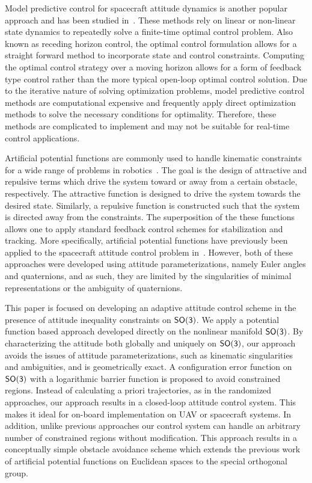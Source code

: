 \documentclass[fleqn]{IJCAS}  %
\begin{document}
\begin{multicols}{2}
Model predictive control for spacecraft attitude dynamics is another popular approach and has been studied in~\cite{guiggiani2014,kalabic2014,gupta2015}.
These methods rely on linear or non-linear state dynamics to repeatedly solve a finite-time optimal control problem.
Also known as receding horizon control, the optimal control formulation allows for a straight forward method to incorporate state and control constraints.
Computing the optimal control strategy over a moving horizon allows for a form of feedback type control rather than the more typical open-loop optimal control solution.
Due to the iterative nature of solving optimization problems, model predictive control methods are computational expensive and frequently apply direct optimization methods to solve the necessary conditions for optimality.
Therefore, these methods are complicated to implement and may not be suitable for real-time control applications.
  
Artificial potential functions are commonly used to handle kinematic constraints for a wide range of problems in robotics~\cite{rimon1992}.
The goal is the design of attractive and repulsive terms which drive the system toward or away from a certain obstacle, respectively.
The attractive function is designed to drive the system towards the desired state.
Similarly, a repulsive function is constructed such that the system is directed away from the constraints. 
The superposition of the these functions allows one to apply standard feedback control schemes for stabilization and tracking.
More specifically, artificial potential functions have previously been applied to the spacecraft attitude control problem in~\cite{lee2011b,mcinnes1994}.
However, both of these approaches were developed using attitude parameterizations, namely Euler angles and quaternions, and as such, they are limited by the singularities of minimal representations or the ambiguity of quaternions.

This paper is focused on developing an adaptive attitude control scheme in the presence of attitude inequality constraints on \(\mathsf{SO(3)}\).
We apply a potential function based approach developed directly on the nonlinear manifold \(\mathsf{SO(3)}\). 
By characterizing the attitude both globally and uniquely on \(\mathsf{SO(3)}\), our approach avoids the issues of attitude parameterizations, such as kinematic singularities and ambiguities, and is geometrically exact. 
A configuration error function on \(\mathsf{SO(3)}\) with a logarithmic barrier function is proposed to avoid constrained regions. 
Instead of calculating a priori trajectories, as in the randomized approaches, our approach results in a closed-loop attitude control system. 
This makes it ideal for on-board implementation on UAV or spacecraft systems. 
In addition, unlike previous approaches our control system can handle an arbitrary number of constrained regions without modification.
This approach results in a conceptually simple obstacle avoidance scheme which extends the previous work of artificial potential functions on Euclidean spaces to the special orthogonal group.


\end{multicols}
\end{document}
